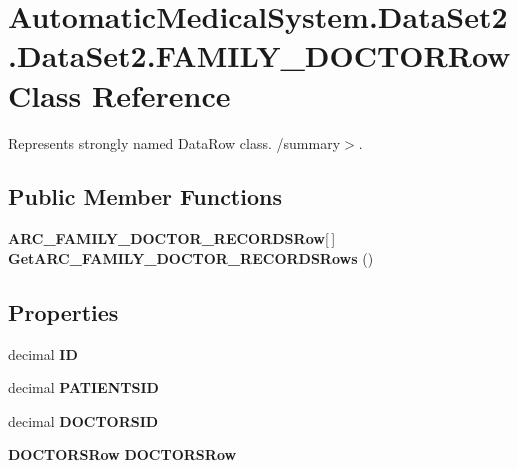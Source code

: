 \section{AutomaticMedicalSystem.DataSet2.DataSet2.FAMILY\_\-DOCTORRow Class Reference}
\label{class_automatic_medical_system_1_1_data_set2_1_1_f_a_m_i_l_y___d_o_c_t_o_r_row}
Represents strongly named DataRow class. /summary$>$.  


\subsection*{Public Member Functions}
\begin{CompactItemize}
\item 
{\bf ARC\_\-FAMILY\_\-DOCTOR\_\-RECORDSRow}[$\,$] \textbf{GetARC\_\-FAMILY\_\-DOCTOR\_\-RECORDSRows} ()\label{class_automatic_medical_system_1_1_data_set2_1_1_f_a_m_i_l_y___d_o_c_t_o_r_row_a1cd91120f9d175fb5e8303b13f55769}

\end{CompactItemize}
\subsection*{Properties}
\begin{CompactItemize}
\item 
decimal \textbf{ID}\hspace{0.3cm}{\tt  [get, set]}\label{class_automatic_medical_system_1_1_data_set2_1_1_f_a_m_i_l_y___d_o_c_t_o_r_row_fd5cfe2ea0c93b8044bb77d7650efb16}

\item 
decimal \textbf{PATIENTSID}\hspace{0.3cm}{\tt  [get, set]}\label{class_automatic_medical_system_1_1_data_set2_1_1_f_a_m_i_l_y___d_o_c_t_o_r_row_b3ac363dd652fb10975a4c192904a07c}

\item 
decimal \textbf{DOCTORSID}\hspace{0.3cm}{\tt  [get, set]}\label{class_automatic_medical_system_1_1_data_set2_1_1_f_a_m_i_l_y___d_o_c_t_o_r_row_222fd93f735c8a421ead0e59bad84f61}

\item 
{\bf DOCTORSRow} \textbf{DOCTORSRow}\hspace{0.3cm}{\tt  [get, set]}\label{class_automatic_medical_system_1_1_data_set2_1_1_f_a_m_i_l_y___d_o_c_t_o_r_row_de4b6ff8240a6a2f1e877b512bb827b0}

\end{CompactItemize}


